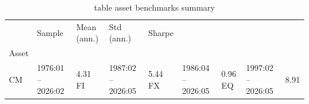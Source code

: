\begin{table}[htbp]
  \centering
  \caption{table asset benchmarks summary}
  \label{tab:table_asset_benchmarks_summary}
  \begin{tabular}{lllll}
\toprule
 & Sample & Mean (ann.) & Std (ann.) & Sharpe \\
Asset &  &  &  &  \\
\midrule
CM & 1976:01 – 2026:02 & 4.31%
FI & 1987:02 – 2026:05 & 5.44%
FX & 1986:04 – 2026:05 & 0.96%
EQ & 1997:02 – 2026:05 & 8.91%
\bottomrule
\end{tabular}

\end{table}
